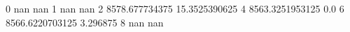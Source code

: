 0 nan nan
1 nan nan
2 8578.677734375 15.3525390625
4 8563.3251953125 0.0
6 8566.6220703125 3.296875
8 nan nan
